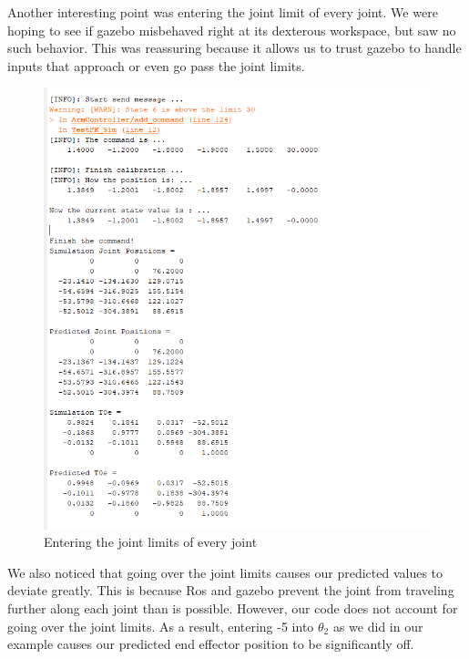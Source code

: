 \documentclass[12pt]{article}
\begin{document}
\begin{enumerate}
\newpage
\par{
Another interesting point was entering the joint limit of every joint. We were hoping to see if gazebo misbehaved right at its dexterous workspace, but saw no such behavior. This was reassuring because it allows us to trust gazebo to handle inputs that approach or even go pass the joint limits.
}\\
\begin{figure} [h]
	\centering 
\includegraphics[scale=.5]{entering the joint limits of every joint}
\caption{Entering the joint limits of every joint}
\end{figure}
 \newpage
\par{
We also noticed that going over the joint limits causes our predicted values to deviate greatly. This is because Ros and gazebo prevent the joint from traveling further along each joint than is possible. However, our code does not account for going over the joint limits. As a result, entering -5 into $\theta_{2}$ as we did in our example causes our predicted end effector position to be significantly off.
}
\\
\begin{figure} [h!]
	\centering 

\end{figure}
\end{enumerate}
\end{document}
